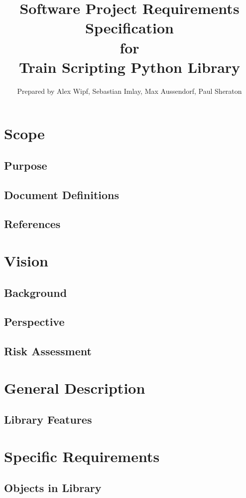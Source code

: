 \documentclass[a4paper,11pt,notitlepage]{article}
\title{{\bf Software Project Requirements Specification} \\ for \\ {\bf Train Scripting Python Library}}
\author{Prepared by Alex Wipf, Sebastian Imlay, Max Aussendorf, Paul Sheraton}
\begin{document}
\maketitle
\pagebreak

\tableofcontents

\section{Scope}
\subsection{Purpose}
\subsection{Document Definitions}
\subsection{References}

\section{Vision}
\subsection{Background}
\subsection{Perspective}
\subsection{Risk Assessment}

\section{General Description}
\subsection{Library Features}

\section{Specific Requirements}
\subsection{Objects in Library}
\end{document}
